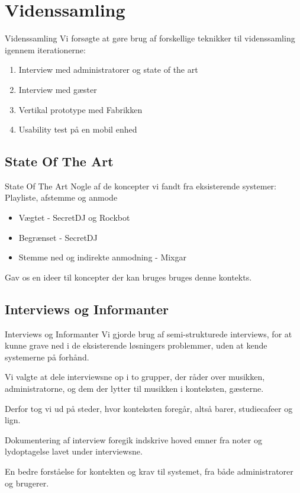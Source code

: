 \section{Videnssamling}
\begin{frame}{Videnssamling}
Vi forsøgte at gøre brug af forskellige teknikker til videnssamling igennem iterationerne:
\begin{enumerate}
\item Interview med administratorer og state of the art
\item Interview med gæster
\item Vertikal prototype med Fabrikken
\item Usability test på en mobil enhed
\end{enumerate}
\end{frame}

\subsection{State Of The Art}
\begin{frame}{State Of The Art}
	Nogle af de koncepter vi fandt fra eksisterende systemer:
	Playliste, afstemme og anmode
	\begin{itemize}
	\item Vægtet - SecretDJ og Rockbot
	\item Begrænset - SecretDJ
	\item Stemme ned og indirekte anmodning - Mixgar
	\end{itemize}

	Gav os en ideer til koncepter der kan bruges bruges denne kontekts.
\end{frame}
\subsection{Interviews og Informanter}
\begin{frame}{Interviews og Informanter}
	Vi gjorde brug af semi-strukturede interviews, for at kunne grave ned i de eksisterende løsningers problemmer, uden at kende systemerne på forhånd.

	Vi valgte at dele interviewsne op i to grupper, der råder over musikken, administratorne, og dem der lytter til musikken i konteksten, gæsterne.

	Derfor tog vi ud på steder, hvor konteksten foregår, altså barer, studiecafeer og lign.

	Dokumentering af interview foregik indskrive hoved emner fra noter og lydoptagelse lavet under interviewsne.

	En bedre forståelse for kontekten og krav til systemet, fra både administratorer og brugerer.
\end{frame}
